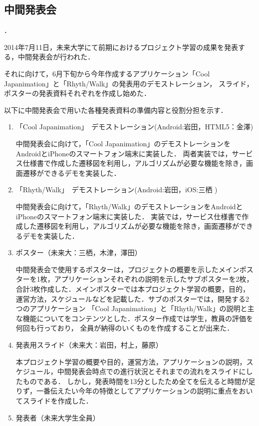 \subsection{中間発表会}
．
\par
2014年7月11日，未来大学にて前期におけるプロジェクト学習の成果を発表する，中間発表会が行われた．
\par
それに向けて，6月下旬から今年作成するアプリケーション「Cool Japanimation」と「Rhyth/Walk」の発表用のデモストレーション，
スライド，ポスターの発表資料それぞれを作成し始めた．
\par
以下に中間発表会で用いた各種発表資料の準備内容と役割分担を示す．
\begin{enumerate}
\item
「Cool Japanimation」　デモストレーション(Android:岩田，HTML5：金澤)
\par 中間発表会に向けて，「Cool Japanimation」のデモストレーションをAndroidとiPhoneのスマートフォン端末に実装した．
両者実装では，サービス仕様書で作成した遷移図を利用し，アルゴリズムが必要な機能を除き，画面遷移ができるデモを実装した．
\item 「Rhyth/Walk」　デモストレーション(Android:岩田，iOS:三栖 )
\par
中間発表会に向けて，「Rhyth/Walk」のデモストレーションをAndroidとiPhoneのスマートフォン端末に実装した．
実装では，サービス仕様書で作成した遷移図を利用し，アルゴリズムが必要な機能を除き，画面遷移ができるデモを実装した．
\item ポスター（未来大：三栖，木津，澤田）
\par
中間発表会で使用するポスターは，プロジェクトの概要を示したメインポスターを1枚，アプリケーションそれぞれの説明を示したサブポスターを2枚，
合計3枚作成した．メインポスターでは本プロジェクト学習の概要，目的，運営方法，スケジュールなどを記載した．サブのポスターでは，開発する2つのアプリケーション
「Cool Japanimation」と「Rhyth/Walk」の説明と主な機能についてをコンテンツとした．ポスター作成では学生，教員の評価を何回も行っており，
全員が納得のいくものを作成することが出来た．
\item 発表用スライド（未来大：岩田，村上，藤原）
\par
本プロジェクト学習の概要や目的，運営方法，アプリケーションの説明，スケジュール，中間発表会時点での進行状況とそれまでの流れをスライドにしたものである．
しかし，発表時間を13分としたため全てを伝えると時間が足りず，一番伝えたい今年の特徴としてアプリケーションの説明に重点をおいてスライドを作成した．
\item 発表者（未来大学生全員）

\end{enumerate}
